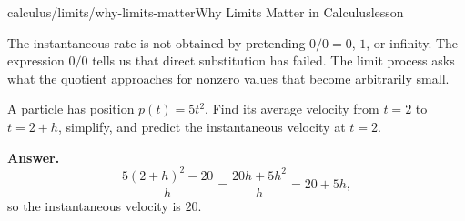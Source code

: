 \begin{webpage}{calculus/limits/why-limits-matter}{Why Limits Matter in Calculus}{lesson}
\begin{bgmistake}
The instantaneous rate is not obtained by pretending \(0/0=0\), \(1\), or infinity. The expression \(0/0\) tells us that direct substitution has failed. The limit process asks what the quotient approaches for nonzero values that become arbitrarily small.
\end{bgmistake}

\begin{bgquickcheck}
A particle has position \(p(t)=5t^2\). Find its average velocity from \(t=2\) to \(t=2+h\), simplify, and predict the instantaneous velocity at \(t=2\).

\textbf{Answer.}
\[
\frac{5(2+h)^2-20}{h}
=\frac{20h+5h^2}{h}
=20+5h,
\]
so the instantaneous velocity is \(20\).
\end{bgquickcheck}
\end{webpage}

